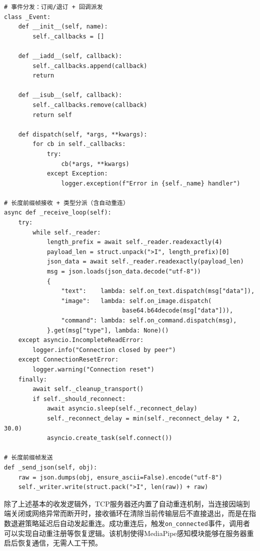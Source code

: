 \documentclass[bachelor]{njupthesis}
\begin{document}
\begin{code}
\caption{简化的TCP服务端 客户端核心代码}
\label{code:tcp-client}
\lstset{style=codeblock}
\begin{lstlisting}
# 事件分发：订阅/退订 + 回调派发
class _Event:
    def __init__(self, name):
        self._callbacks = []

    def __iadd__(self, callback):
        self._callbacks.append(callback)
        return 

    def __isub__(self, callback):
        self._callbacks.remove(callback)
        return self

    def dispatch(self, *args, **kwargs):
        for cb in self._callbacks:
            try:
                cb(*args, **kwargs)
            except Exception:
                logger.exception(f"Error in {self._name} handler")

# 长度前缀帧接收 + 类型分派（含自动重连）
async def _receive_loop(self):
    try:
        while self._reader:
            length_prefix = await self._reader.readexactly(4)
            payload_len = struct.unpack(">I", length_prefix)[0]
            json_data = await self._reader.readexactly(payload_len)
            msg = json.loads(json_data.decode("utf-8"))
            {
                "text":    lambda: self.on_text.dispatch(msg["data"]),
                "image":   lambda: self.on_image.dispatch(
                                 base64.b64decode(msg["data"])),
                "command": lambda: self.on_command.dispatch(msg),
            }.get(msg["type"], lambda: None)()
    except asyncio.IncompleteReadError:
        logger.info("Connection closed by peer")
    except ConnectionResetError:
        logger.warning("Connection reset")
    finally:
        await self._cleanup_transport()
        if self._should_reconnect:
            await asyncio.sleep(self._reconnect_delay)
            self._reconnect_delay = min(self._reconnect_delay * 2, 30.0)
            asyncio.create_task(self.connect())

# 长度前缀帧发送
def _send_json(self, obj):
    raw = json.dumps(obj, ensure_ascii=False).encode("utf-8")
    self._writer.write(struct.pack(">I", len(raw)) + raw)
\end{lstlisting}
\end{code}

除了上述基本的收发逻辑外，TCP服务器还内置了自动重连机制，当连接因端到端关闭或网络异常而断开时，接收循环在清除当前传输层后不直接退出，而是在指数退避策略延迟后自动发起重连。成功重连后，触发\texttt{on\_connected}事件，调用者可以实现自动重注册等恢复逻辑。该机制使得MediaPipe感知模块能够在服务器重启后恢复通信，无需人工干预。
\end{document}
